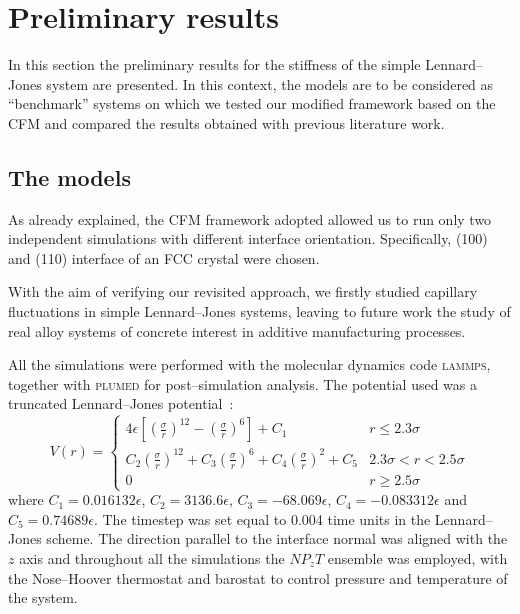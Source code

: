 \section{Preliminary results\label{sec:results}}
In this section the preliminary results for the stiffness of the simple Lennard--Jones system are presented. In this context, the models are to be considered as ``benchmark'' systems on which we tested our modified framework based on the CFM and compared the results obtained with previous literature work.

\subsection{The models}
As already explained, the CFM framework adopted allowed us to run only two independent simulations with different interface orientation. Specifically, (100) and (110) interface of an FCC crystal were chosen.

With the aim of verifying our revisited approach, we firstly studied capillary fluctuations in simple Lennard--Jones systems, leaving to future work the study of real alloy systems of concrete interest in additive manufacturing processes.

All the simulations were performed with the molecular dynamics code \textsc{lammps}, together with \textsc{plumed} for post--simulation analysis. The potential used was a truncated Lennard--Jones potential~\cite{Cheng2015}:
\begin{equation}
    \label{eqn:LJ}
    V(r)=
    \begin{cases}
        4\epsilon\left[ \left(\frac{\sigma}{r}\right)^{12} - \left( \frac{\sigma}{r}\right)^6 \right] + C_1 & r\le 2.3\sigma \\
        C_2 \left(\frac{\sigma}{r}\right)^{12}+ C_3 \left(\frac{\sigma}{r}\right)^6 + C_4 \left(\frac{\sigma}{r}\right)^2 + C_5 & 2.3\sigma < r < 2.5\sigma \\
        0 & r\ge 2.5\sigma
    \end{cases}
\end{equation}
where $C_1=0.016132\epsilon$, $C_2=3136.6\epsilon$, $C_3=-68.069\epsilon$, $C_4=-0.083312\epsilon$ and $C_5=0.74689\epsilon$. The timestep was set equal to 0.004 time units in the Lennard--Jones scheme. The direction parallel to the interface normal was aligned with the $z$ axis and throughout all the simulations the $NP_zT$ ensemble was employed, with the Nose--Hoover thermostat and barostat to control pressure and temperature of the system.

